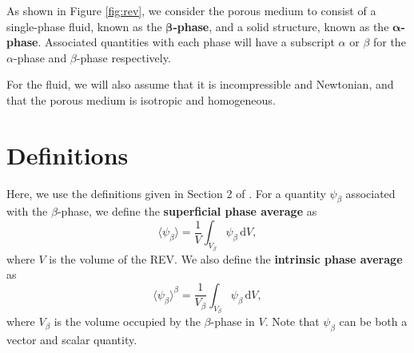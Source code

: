 \documentclass[a4paper, 11pt]{report}
\begin{document}
As shown in Figure \ref{fig:rev}, we consider the porous medium to consist of a single-phase fluid, known as the $\bm{\beta}$\textbf{-phase}, and a solid structure, known as the $\bm{\alpha}$\textbf{-phase}. Associated quantities with each phase will have a subscript $\alpha$ or $\beta$ for the $\alpha$-phase and $\beta$-phase respectively. 

For the fluid, we will also assume that it is incompressible and Newtonian, and that the porous medium is isotropic and homogeneous. 


\section{Definitions}
Here, we use the definitions given in Section 2 of \cite{whitakerdarcy}. For a quantity $\psi_\beta$ associated with the $\beta$-phase, we define the \textbf{superficial phase average} as
\begin{equation}
\langle\psi_\beta\rangle = \frac{1}{V} \int_{V_\beta} \! \psi_\beta \, \mathrm{d}V, \label{eq:2.1}
\end{equation}
where $V$ is the volume of the REV. We also define the \textbf{intrinsic phase average} as
\begin{equation}
\langle\psi_\beta\rangle^\beta = \frac{1}{V_\beta} \int_{V_\beta} \! \psi_\beta \, \mathrm{d}V, \label{eq:2.2}
\end{equation}
where $V_\beta$ is the volume occupied by the $\beta$-phase in $V$. Note that $\psi_\beta$ can be both a vector and scalar quantity.
\end{document}
